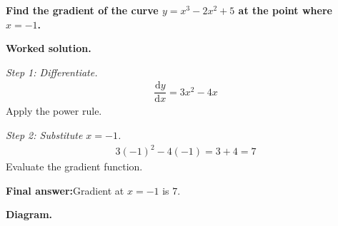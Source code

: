 \documentclass[11pt]{article}
\newcommand{\question}[1]{\par\medskip\noindent\textbf{#1}\par}
\begin{document}
\question{Find the gradient of the curve \( y = x^3 - 2x^2 + 5 \) at the point where \( x = -1 \).}

\textbf{Worked solution.}

\textit{Step 1: Differentiate.}
\[\begin{gathered}
\dfrac{\mathrm{d}y}{\mathrm{d}x} = 3x^2 - 4x
\end{gathered}\]
Apply the power rule.

\textit{Step 2: Substitute \( x = -1 \).}
\[\begin{gathered}
3(-1)^2 - 4(-1) = 3 + 4 = 7
\end{gathered}\]
Evaluate the gradient function.

\begin{answerbox}
\textbf{Final answer:}\quad Gradient at \(\displaystyle  x = -1 \) is \(\displaystyle  7 \).
\end{answerbox}
\textbf{Diagram.}
\end{document}
